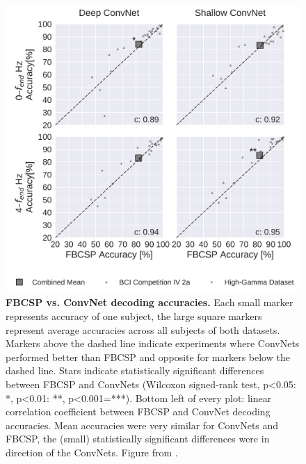 \begin{figure}[htb]
    \myfloatalign
    \includegraphics[width=1\linewidth]{images/Final_Comparison.ipynb.2.png}
    \caption[FBCSP vs. ConvNet decoding accuracies.]{
\textbf{FBCSP vs. ConvNet decoding accuracies.} Each small marker
represents accuracy of one subject, the large square markers represent
average accuracies across all subjects of both datasets. Markers above
the dashed line indicate experiments where ConvNets performed better
than FBCSP and opposite for markers below the dashed line. Stars
indicate statistically significant differences between FBCSP and
ConvNets (Wilcoxon signed-rank test, p\textless0.05: *, p\textless0.01:
**, p\textless0.001=***). Bottom left of every plot: linear correlation
coefficient between FBCSP and ConvNet decoding accuracies. Mean
accuracies were very similar for ConvNets and FBCSP, the (small)
statistically significant differences were in direction of the ConvNets.
Figure from \citet{schirrmeisterdeephbm2017}.
}
\label{movement-decoding-result-comparison-figure}
\end{figure}


